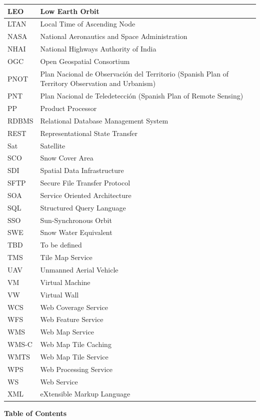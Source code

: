 \documentclass[a4paper]{article}
\begin{document}
\begin{flushleft}
\begin{supertabular}{|m{0.8823598in}|m{5.35596in}|}
LEO &
Low Earth Orbit\\\hline
LTAN &
Local Time of Ascending Node\\\hline
NASA &
National Aeronautics and Space Administration\\\hline
NHAI &
National Highways Authority of India\\\hline
OGC &
Open Geospatial Consortium\\\hline
PNOT &
Plan Nacional de Observaci\'on del Territorio (Spanish Plan of Territory
Observation and Urbanism)\\\hline
PNT &
Plan Nacional de Teledetecci\'on (Spanish Plan of Remote
Sensing)\\\hline
PP &
Product Processor\\\hline
RDBMS &
Relational Database Management System\\\hline
REST &
Representational State Transfer\\\hline
Sat &
Satellite\\\hline
SCO &
Snow Cover Area\\\hline
SDI &
Spatial Data Infrastructure\\\hline
SFTP &
Secure File Transfer Protocol\\\hline
SOA &
Service Oriented Architecture\\\hline
SQL &
Structured Query Language\\\hline
SSO &
Sun-Synchronous Orbit\\\hline
SWE &
Snow Water Equivalent\\\hline
TBD &
To be defined\\\hline
TMS &
Tile Map Service\\\hline
UAV &
Unmanned Aerial Vehicle\\\hline
VM &
Virtual Machine\\\hline
VW &
Virtual Wall\\\hline
WCS &
Web Coverage Service\\\hline
WFS &
Web Feature Service\\\hline
WMS &
Web Map Service\\\hline
WMS-C &
Web Map Tile Caching\\\hline
WMTS &
Web Map Tile Service\\\hline
WPS &
Web Processing Service\\\hline
WS &
Web Service\\\hline
XML &
eXtensible Markup Language\\\hline
\end{supertabular}
\end{flushleft}
\clearpage
\textrm{\textbf{Table of C}}\textrm{\textbf{ontents}}
\end{document}
